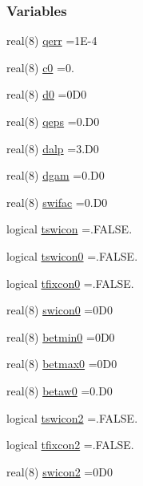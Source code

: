 \subsubsection*{Variables}
\begin{DoxyCompactItemize}
\item 
real(8) \hyperlink{namespaceconstr_a4e28cb213fb0c9679bdcca7dd4c64542}{qerr} =1\+E-\/4
\item 
real(8) \hyperlink{namespaceconstr_acae195768a31542ac96a58b68d894253}{c0} =0.
\item 
real(8) \hyperlink{namespaceconstr_a604072f42d782b0664f52b3c06da75f3}{d0} =0\+D0
\item 
real(8) \hyperlink{namespaceconstr_a16ee5bae6ffa0fec223e35ca042499a8}{qeps} =0.\+D0
\item 
real(8) \hyperlink{namespaceconstr_a059179482b95154c05c0476d1fd80dda}{dalp} =3.\+D0
\item 
real(8) \hyperlink{namespaceconstr_a2ba7200830052d0e14c259604eb096be}{dgam} =0.\+D0
\item 
real(8) \hyperlink{namespaceconstr_a3fd79277600455ba53c2bba7052f8d14}{swifac} =0.\+D0
\item 
logical \hyperlink{namespaceconstr_adc54cf7417be68f0c9e76ac4aa3a2785}{tswicon} =.F\+A\+L\+S\+E.
\item 
logical \hyperlink{namespaceconstr_ab201eb89c495c33e406fb3e01120314e}{tswicon0} =.F\+A\+L\+S\+E.
\item 
logical \hyperlink{namespaceconstr_a76159265fc288587aafd56361bfe9706}{tfixcon0} =.F\+A\+L\+S\+E.
\item 
real(8) \hyperlink{namespaceconstr_ad537476e003e8f1e0d92299966b5fe70}{swicon0} =0\+D0
\item 
real(8) \hyperlink{namespaceconstr_abe35529a6c8456a7cf906998a2aaedfb}{betmin0} =0\+D0
\item 
real(8) \hyperlink{namespaceconstr_a7fbe5760b32df936a8089956632bff62}{betmax0} =0\+D0
\item 
real(8) \hyperlink{namespaceconstr_af683ee0f56a77110349e1fcde0234c2d}{betaw0} =0.\+D0
\item 
logical \hyperlink{namespaceconstr_ad4c9b2c5bda593b7630642866cd93358}{tswicon2} =.F\+A\+L\+S\+E.
\item 
logical \hyperlink{namespaceconstr_a66742ff27c6afbcbc425dfb72bca40dd}{tfixcon2} =.F\+A\+L\+S\+E.
\item 
real(8) \hyperlink{namespaceconstr_a0206f7a3b7b30d7f3823f15aba53bae8}{swicon2} =0\+D0
\item 

\end{DoxyCompactItemize}
